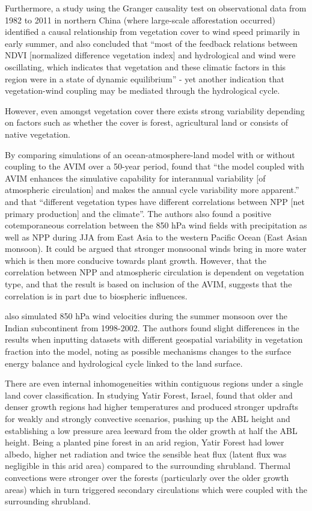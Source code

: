 Furthermore, a study using the Granger causality test on observational data from 1982 to 2011 in northern China (where large-scale afforestation occurred) identified a causal relationship from vegetation cover to wind speed primarily in early summer, and also concluded that “most of the feedback relations between NDVI [normalized difference vegetation index] and hydrological and wind were oscillating, which indicates that vegetation and these climatic factors in this region were in a state of dynamic equilibrium” - yet another indication that vegetation-wind coupling may be mediated through the hydrological cycle. 

However, even amongst vegetation cover there exists strong variability depending on factors such as whether the cover is forest, agricultural land or consists of native vegetation.

By comparing simulations of an ocean-atmosphere-land model with or without coupling to the \ac{AVIM} over a 50-year period, \citet{zhi2009} found that “the model coupled with AVIM enhances the simulative capability for interannual variability [of atmospheric circulation] and makes the annual cycle variability more apparent.” and that “different vegetation types have different correlations between NPP [net primary production] and the climate”. The authors also found a positive cotemporaneous correlation between the 850 hPa wind fields with precipitation as well as \ac{NPP} during \ac{JJA} from East Asia to the western Pacific Ocean (East Asian monsoon). It could be argued that stronger monsoonal winds bring in more water which is then more conducive towards plant growth. However, that the correlation between \ac{NPP} and atmospheric circulation is dependent on vegetation type, and that the result is based on inclusion of the \ac{AVIM}, suggests that the correlation is in part due to biospheric influences.

\citet{dutta2009} also simulated 850 hPa wind velocities during the summer monsoon over the Indian subcontinent from 1998-2002. The authors found slight differences in the results when inputting datasets with different geospatial variability in vegetation fraction into the model, noting as possible mechanisms changes to the surface energy balance and hydrological cycle linked to the land surface.

There are even internal inhomogeneities within contiguous regions under a single land cover classification. In studying Yatir Forest, Israel, \citet{kroniger2018} found that older and denser growth regions had higher temperatures and produced stronger updrafts for weakly and strongly convective scenarios, pushing up the ABL height and establishing a low pressure area leeward from the older growth at half the ABL height. Being a planted pine forest in an arid region, Yatir Forest had lower albedo, higher net radiation and twice the sensible heat flux (latent flux was negligible in this arid area) compared to the surrounding shrubland. Thermal convections were stronger over the forests (particularly over the older growth areas) which in turn triggered secondary circulations which were coupled with the surrounding shrubland.

